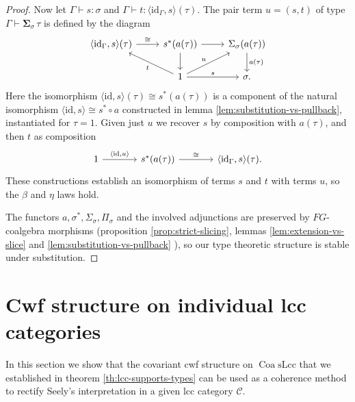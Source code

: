\documentclass[a4paper]{article}
\theoremstyle{remark}
\theoremstyle{definition}
\begin{document}
\begin{proof}
  Now let $\Gamma \vdash s : \sigma$ and $\Gamma \vdash t : \langle \mathrm{id}_\Gamma, s \rangle(\tau)$.
  The pair term $u = (s, t)$ of type $\Gamma \vdash \mathbf{\Sigma}_\sigma \, \tau$ is defined by the diagram
  \begin{equation}
    \begin{tikzcd}
      \langle \mathrm{id}_\Gamma, s \rangle(\tau) \arrow[r, "\cong"] & s^*(a(\tau)) \arrow[r] \arrow[d] & \Sigma_\sigma(a(\tau)) \arrow[d, "a(\tau)"] \\
      & 1 \arrow[ul, "t"] \arrow[r, "s"] \arrow[ur, "u"] & \sigma.
    \end{tikzcd}
  \end{equation}
  Here the isomorphism $\langle \mathrm{id}, s \rangle(\tau) \cong s^*(a(\tau))$ is a component of the natural isomorphism $\langle \mathrm{id}, s \rangle \cong s^* \circ a$ constructed in lemma \ref{lem:substitution-vs-pullback}, instantiated for $\tau = 1$.
  Given just $u$ we recover $s$ by composition with $a(\tau)$, and then $t$ as composition
  \begin{equation}
    \begin{tikzcd}[column sep=large]
      1 \arrow[r, "{\langle \mathrm{id}, u \rangle}"] & s^*(a(\tau)) \arrow[r, "\cong"] & \langle \mathrm{id}_\Gamma, s \rangle(\tau).
    \end{tikzcd}
  \end{equation}
  These constructions establish an isomorphism of terms $s$ and $t$ with terms $u$, so the $\beta$ and $\eta$ laws hold.

  The functors $a, \sigma^*, \Sigma_\sigma, \Pi_\sigma$ and the involved adjunctions are preserved by $FG$-coalgebra morphisms (proposition \ref{prop:strict-slicing}, lemmas \ref{lem:extension-vs-slice} and \ref{lem:substitution-vs-pullback} ), so our type theoretic structure is stable under substitution.
\end{proof}

\section{Cwf structure on individual lcc categories}
\label{sec:applications}

In this section we show that the covariant cwf structure on $\operatorname{Coa} \mathrm{sLcc}$ that we established in theorem \ref{th:lcc-supports-types} can be used as a coherence method to rectify Seely's interpretation in a given lcc category $\mathcal{C}$.
\end{document}
